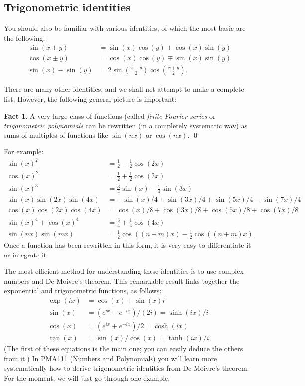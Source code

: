 \documentclass[a4paper]{book}
\newcommand{\PURPLE}[1]{{\color{purple}#1}}
\renewcommand{\:}{\colon}
\newcommand{\PMA}[1]{PMA#1}
\newcommand{\DEFN}[1]{\PURPLE{\emph{#1}}}
\theoremstyle{definition}
\newtheorem{fact}[theorem]{Fact}
\begin{document}
\subsection{Trigonometric identities}
\label{subsec-trig-id}

You should also be familiar with various identities, of which the most
basic are the following:
\begin{align*}
 \sin(x\pm y) &= \sin(x)\cos(y) \pm \cos(x)\sin(y) \\
 \cos(x\pm y) &= \cos(x)\cos(y) \mp \sin(x)\sin(y) \\
 \sin(x)-\sin(y) &= 2 \sin\left(\frac{x-y}{2}\right)
                      \cos\left(\frac{x+y}{2}\right).
\end{align*}

There are many other identities, and we shall not attempt to make a
complete list.  However, the following general picture is important:
\begin{fact}
 A very large class of functions (called \DEFN{finite Fourier series}
 or \DEFN{trigonometric polynomials} can be rewritten (in a completely
 systematic way) as sums of multiples of functions like $\sin(nx)$ or
 $\cos(nx)$. \qed
\end{fact}
For example:
\begin{align*}
 \sin(x)^2 &= \tfrac{1}{2} - \tfrac{1}{2}\cos(2x) \\
 \cos(x)^2 &= \tfrac{1}{2} + \tfrac{1}{2}\cos(2x) \\
 \sin(x)^3 &= \tfrac{3}{4}\sin(x) - \tfrac{1}{4}\sin(3x) \\
 \sin(x)\sin(2x)\sin(4x)
  &= -\sin(x)/4 + \sin(3x)/4 + \sin(5x)/4 - \sin(7x)/4 \\
 \cos(x)\cos(2x)\cos(4x)
  &= \cos(x)/8 + \cos(3x)/8 + \cos(5x)/8 + \cos(7x)/8 \\
 \sin(x)^4 + \cos(x)^4
  &= \tfrac{3}{4} + \tfrac{1}{4}\cos(4x) \\
 \sin(nx)\sin(mx) &=
  \tfrac{1}{2}\cos((n-m)x) - \tfrac{1}{2}\cos((n+m)x).
\end{align*}
Once a function has been rewritten in this form, it is very easy to
differentiate it or integrate it.

The most efficient method for understanding these identities is to use
complex numbers and De Moivre's theorem.  This remarkable result links
together the exponential and trigonometric functions, as follows:
\begin{align*}
 \exp(ix) &= \cos(x) + \sin(x) i \\
 \sin(x)  &= (e^{ix}-e^{-ix})/(2i) = \sinh(ix)/i \\
 \cos(x)  &= (e^{ix}+e^{-ix})/2 = \cosh(ix) \\
 \tan(x)  &= \sin(x)/\cos(x) = \tanh(ix)/i.
\end{align*}
(The first of these equations is the main one; you can easily deduce
the others from it.)  In \PMA{111} (Numbers and Polynomials) you will
learn more systematically how to derive trigonometric identities from
De Moivre's theorem.  For the moment, we will just go through one
example.
\end{document}
